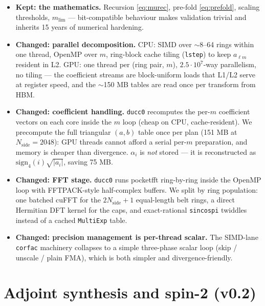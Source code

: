 \documentclass[11pt]{article}
\begin{document}
\begin{itemize}
\item \textbf{Kept: the mathematics.}  Recursion \eqref{eq:murec},
  pre-fold \eqref{eq:prefold}, scaling thresholds, $m_\mathrm{lim}$ ---
  bit-compatible behaviour makes validation trivial and inherits 15 years
  of numerical hardening.
\item \textbf{Changed: parallel decomposition.}  CPU: SIMD over
  $\sim$8--64 rings within one thread, OpenMP over $m$, ring-block cache
  tiling (\texttt{lstep}) to keep $a_{\ell m}$ resident in L2.  GPU: one
  thread per (ring pair, $m$), $2.5\cdot10^7$-way parallelism, no tiling
  --- the coefficient streams are block-uniform loads that L1/L2 serve at
  register speed, and the $\sim$150 MB tables are read once per transform
  from HBM.
\item \textbf{Changed: coefficient handling.}  \texttt{ducc0} recomputes
  the per-$m$ coefficient vectors on each core inside the $m$ loop (cheap
  on CPU, cache-resident).  We precompute the full triangular $(a,b)$
  table once per plan (151 MB at $N_\mathrm{side}{=}2048$): GPU threads
  cannot afford a serial per-$m$ preparation, and memory is cheaper than
  divergence.  $\alpha_i$ is \emph{not} stored --- it is reconstructed as
  $\mathrm{sign}_4(i)\sqrt{|a_i|}$, saving 75 MB.
\item \textbf{Changed: FFT stage.}  \texttt{ducc0} runs pocketfft
  ring-by-ring inside the OpenMP loop with FFTPACK-style half-complex
  buffers.  We split by ring population: one batched cuFFT for the
  $2N_\mathrm{side}{+}1$ equal-length belt rings, a direct Hermitian DFT
  kernel for the caps, and exact-rational \texttt{sincospi} twiddles
  instead of a cached \texttt{MultiExp} table.
\item \textbf{Changed: precision management is per-thread scalar.}  The
  SIMD-lane \texttt{corfac} machinery collapses to a simple three-phase
  scalar loop (skip / unscale / plain FMA), which is both simpler and
  divergence-friendly.
\end{itemize}

\section{Adjoint synthesis and spin-2 (v0.2)}
\label{sec:v02}
\end{document}
